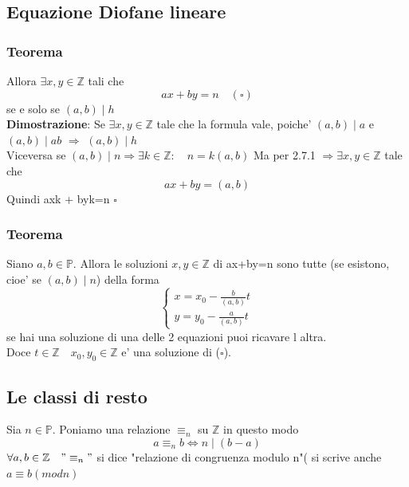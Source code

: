 \documentclass{article}
\begin{document}
    \subsection{Equazione Diofane lineare}
    \subsubsection{Teorema}
    \begin{flushleft}
     Allora $\exists x,y \in \mathbb{Z}$ tali che
     \begin{equation}
       ax+by=n \quad (\square)
     \end{equation}
     se e solo se $(a,b) \mid h$\\ 
     \textbf{Dimostrazione}: Se $\exists x,y \in \mathbb{Z}$ tale che la formula vale, poiche' $(a,b)\mid a$ e $(a,b) \mid ab$ $\Rightarrow$ $(a,b)\mid h$\\ 
     Viceversa se $(a,b)\mid n \Rightarrow \exists k \in \mathbb{Z}: \quad n=k(a,b)$ Ma per 2.7.1 $\Rightarrow \exists x,y \in \mathbb{Z}$ tale che
     \begin{equation}
       ax+by=(a,b)
     \end{equation}
      Quindi axk + byk=n $\square$
    \end{flushleft}
    \subsubsection{Teorema}
    \begin{flushleft}
      Siano $a,b \in \mathbb{P}$. Allora le soluzioni $x,y \in \mathbb{Z}$ di ax+by=n sono tutte (se esistono, cioe' se $(a,b)\mid n$) della forma \\
      \begin{equation}
        \begin{cases}
          x= x_0 - \frac{b}{(a,b)}t \\
          y= y_0 - \frac{a}{(a,b)}t
        \end{cases}
      \end{equation}
      se hai una soluzione di una delle 2 equazioni puoi ricavare l altra.
      \\ 
      Doce $t \in \mathbb{Z} \quad x_0,y_0 \in \mathbb{Z}$ e' una soluzione di ($\square$).
    \end{flushleft}
     \subsection{Le classi di resto} 
     \begin{flushleft}
       Sia $n \in \mathbb{P}$. Poniamo una relazione $\equiv_n$ su $\mathbb{Z}$ in questo modo
       \begin{equation}
         a \equiv_n b \iff n\mid (b-a)
       \end{equation}
       $\forall a,b \in \mathbb{Z} \quad "\equiv_n"$ si dice "relazione di congruenza modulo n"( si scrive anche $a \equiv b(modn)$
     \end{flushleft}
\end{document}
